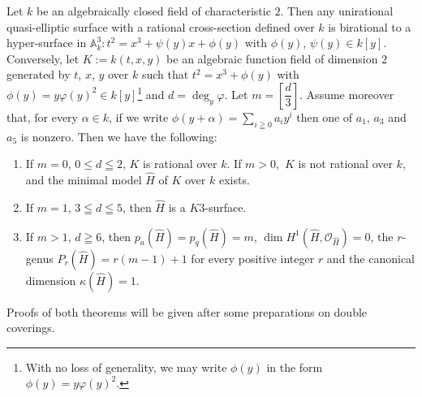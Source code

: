 \subsubsection{}\label{chap3:2.1.2}
\begin{theorem*}
  Let $k$ be an algebraically closed field of characteristic $2$. Then
  any unirational quasi-elliptic surface with a rational cross-section
  defined over $k$ is birational to a hyper-surface in
  $\mathbb{A}^{3}_{k}:t^{2}=x^{3}+\psi(y)x+\phi(y)$ with $\phi(y)$,
  $\psi(y)\in k[y]$. Conversely, let $K:=k(t,x,y)$ be an algebraic
  function field of dimension $2$ generated by $t$, $x$, $y$ over $k$
  such that $t^{2}=x^{3}+\phi(y)$ with $\phi(y)=y\varphi(y)^{2}\in
  k[y]$\footnote{With no loss of generality, we may write $\phi(y)$ in
    the form $\phi(y)=y\varphi(y)^{2}$.} and $d=\deg_{y}\varphi$. Let
  $m=[\dfrac{d}{3}]$. Assume moreover that, for every $\alpha\in k$, if
  we write $\phi(y+\alpha)={\displaystyle{\mathop{\sum}_{i\geqq
        0}}}a_{i}y^{i}$ then one of $a_{1}$, $a_{3}$ and $a_{5}$ is
  nonzero. Then we have the following:
  \begin{enumerate}
    \renewcommand{\theenumi}{\roman{enumi}}
    \renewcommand{\labelenumi}{\rm(\theenumi)}
  \item If $m=0$, \iec $0\leq d\leqq 2$, $K$ is rational over $k$. If
    $m>0$,\pageoriginale\ $K$ is not rational over $k$, and the minimal
    model $\widehat{H}$ of $K$ over $k$ exists.
    
  \item If $m=1$, \iec $3\leqq d\leqq 5$, then $\widehat{H}$ is a
    $K3$-surface.
    
  \item If $m>1$, \iec $d\geqq 6$, then
    $p_{a}(\widehat{H})=p_{q}(\widehat{H})=m$, $\dim
    H^{1}(\widehat{H},\mathscr{O}_{\widehat{H}})=0$, the $r$-genus
    $P_{r}(\widehat{H})=r(m-1)+1$ for every positive integer $r$ and the
    canonical dimension $\kappa(\widehat{H})=1$.
  \end{enumerate}
\end{theorem*}

Proofs of both theorems will be given after some preparations on
double coverings.

